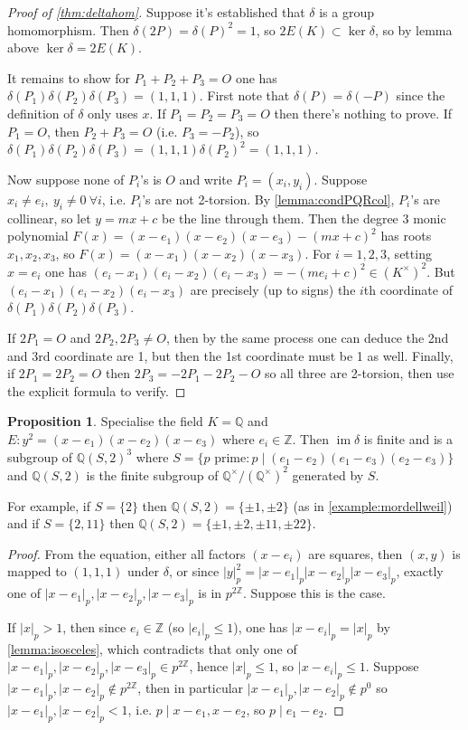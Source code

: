 \documentclass{article}
\newcommand{\Z}{\mathbb{Z}}
\newcommand{\Q}{\mathbb{Q}}
\newcommand{\im}{\operatorname{im}}
\theoremstyle{definition}
\newtheorem{prop}[defn]{Proposition}
\begin{document}
\begin{proof}[Proof of \ref{thm:deltahom}]
Suppose it's established that $\delta$ is a group homomorphism. Then $\delta(2P)=\delta(P)^2=1$, so $2E(K)\subset\ker\delta$, so by lemma above $\ker\delta=2E(K)$.

It remains to show for $P_1+P_2+P_3=O$ one has $\delta(P_1)\delta(P_2)\delta(P_3)=(1,1,1)$. First note that $\delta(P)=\delta(-P)$ since the definition of $\delta$ only uses $x$. If $P_1=P_2=P_3=O$ then there's nothing to prove. If $P_1=O$, then $P_2+P_3=O$ (i.e. $P_3=-P_2$), so $\delta(P_1)\delta(P_2)\delta(P_3)=(1,1,1)\delta(P_2)^2=(1,1,1)$.

Now suppose none of $P_i$'s is $O$ and write $P_i=(x_i,y_i)$. Suppose $x_i\neq e_i,\ y_i\neq 0 \ \forall i$, i.e. $P_i$'s are not 2-torsion. By \ref{lemma:condPQRcol}, $P_i$'s are collinear, so let $y=mx+c$ be the line through them. Then the degree 3 monic polynomial $F(x)=(x-e_1)(x-e_2)(x-e_3)-(mx+c)^2$ has roots $x_1,x_2,x_3$, so $F(x)=(x-x_1)(x-x_2)(x-x_3)$. For $i=1,2,3$, setting $x=e_i$ one has $(e_i-x_1)(e_i-x_2)(e_i-x_3)=-(me_i+c)^2\in (K^\times)^2$. But $(e_i-x_1)(e_i-x_2)(e_i-x_3)$ are precisely (up to signs) the $i$th coordinate of $\delta(P_1)\delta(P_2)\delta(P_3)$.

If $2P_1=O$ and $2P_2,2P_3\neq O$, then by the same process one can deduce the 2nd and 3rd coordinate are 1, but then the 1st coordinate must be 1 as well. Finally, if $2P_1=2P_2=O$ then $2P_3=-2P_1-2P_2-O$ so all three are 2-torsion, then use the explicit formula to verify.
\end{proof}

\begin{prop}
\label{prop:imdeltaisfin}
Specialise the field $K=\Q$ and $E:y^2=(x-e_1)(x-e_2)(x-e_3)$ where $e_i\in\Z$. Then $\im\delta$ is finite and is a subgroup of $\Q(S,2)^3$ where $S=\{p\text{ prime}:p\mid(e_1-e_2)(e_1-e_3)(e_2-e_3)\}$ and $\Q(S,2)$ is the finite subgroup of $\Q^\times/(\Q^\times)^2$ generated by $S$.

For example, if $S=\{2\}$ then $\Q(S,2)=\{\pm 1,\pm 2\}$ (as in \ref{example:mordellweil}) and if $S=\{2,11\}$ then $\Q(S,2)=\{\pm 1,\pm 2,\pm 11,\pm 22\}$.
\end{prop}
\begin{proof}
From the equation, either all factors $(x-e_i)$ are squares, then $(x,y)$ is mapped to $(1,1,1)$ under $\delta$, or since $|y|_p^2=|x-e_1|_p|x-e_2|_p|x-e_3|_p$, exactly one of $|x-e_1|_p,|x-e_2|_p,|x-e_3|_p$ is in $p^{2\Z}$. Suppose this is the case.

If $|x|_p>1$, then since $e_i\in\Z$ (so $|e_i|_p\leq 1$), one has $|x-e_i|_p=|x|_p$ by \ref{lemma:isosceles}, which contradicts that only one of $|x-e_1|_p,|x-e_2|_p,|x-e_3|_p\in p^{2\Z}$, hence $|x|_p\leq 1$, so $|x-e_i|_p\leq 1$. Suppose $|x-e_1|_p,|x-e_2|_p\notin p^{2\Z}$, then in particular $|x-e_1|_p,|x-e_2|_p\notin p^0$ so $|x-e_1|_p,|x-e_2|_p<1$, i.e. $p\mid x-e_1,x-e_2$, so $p\mid e_1-e_2$.
\end{proof}
\end{document}
